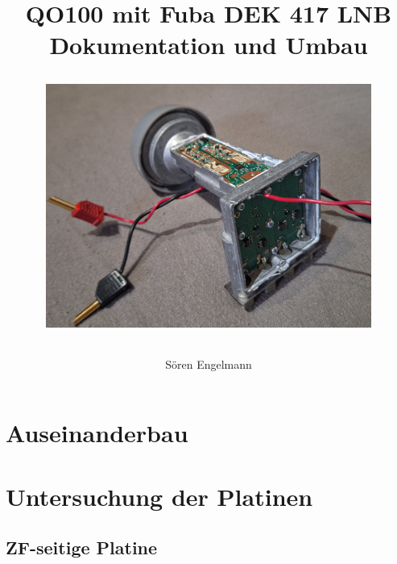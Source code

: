 \documentclass[]{article}
\begin{document}
	
	\title{
		 QO100 mit Fuba DEK 417 LNB\\
		\vspace{1ex}
		\Large Dokumentation und Umbau
		\begin{minipage}{\textwidth}
			\centering
			\vspace{5ex}
			\includegraphics[width=0.8\textwidth]{./img/20250531_191954.jpg}
		\end{minipage}
	}
	\author{Sören Engelmann}
	
	
	
	\maketitle
	\newpage
	
	\section{Auseinanderbau}
	
	
	\section{Untersuchung der Platinen}
	
	\subsection{ZF-seitige Platine}
	
\end{document}
